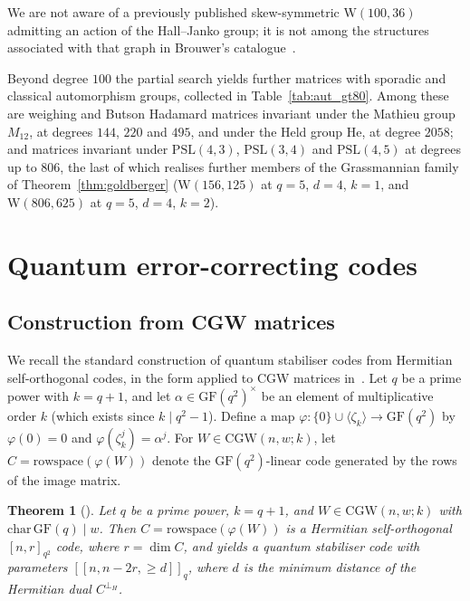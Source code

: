 \documentclass{article}
\newtheorem{theorem}{Theorem}[section]
\theoremstyle{definition}
\theoremstyle{remark}
\newcommand{\CGW}{\mathrm{CGW}}
\newcommand{\We}{\mathrm{W}}
\newcommand{\GF}{\mathrm{GF}}
\begin{document}
We are not aware of a previously published
skew-symmetric $\We(100, 36)$ admitting an action of the Hall--Janko group; 
it is not among the structures associated with that graph in Brouwer's
catalogue~\cite{BrouwerHJ}.

Beyond degree $100$ the partial search yields further matrices with
sporadic and classical automorphism groups, collected in
Table~\ref{tab:aut_gt80}.  Among these are weighing and Butson Hadamard
matrices invariant under the Mathieu group $M_{12}$, at degrees $144$,
$220$ and $495$, and under the Held group $\mathrm{He}$, at degree
$2058$; and matrices invariant under $\mathrm{PSL}(4,3)$,
$\mathrm{PSL}(3,4)$ and $\mathrm{PSL}(4,5)$ at degrees up to $806$, the
last of which realises further members of the Grassmannian family of
Theorem~\ref{thm:goldberger} ($\We(156,125)$ at $q=5$, $d=4$, $k=1$, and
$\We(806,625)$ at $q=5$, $d=4$, $k=2$).


\section{Quantum error-correcting codes}\label{sec:quantum}

\subsection{Construction from CGW matrices}

We recall the standard construction of quantum stabiliser codes from Hermitian self-orthogonal codes, in the form applied to CGW matrices in~\cite{CGW-Survey}.
Let $q$ be a prime power with $k = q+1$, and let $\alpha \in \GF(q^2)^{\times}$ be an element
of multiplicative order $k$ (which exists since $k \mid q^2-1$). Define a map
$\varphi \colon \{0\} \cup \langle \zeta_k \rangle \to \GF(q^2)$ by $\varphi(0) = 0$ and
$\varphi(\zeta_k^j) = \alpha^j$. For $W \in \CGW(n,w;k)$, let
$C = \mathrm{rowspace}(\varphi(W))$ denote the $\GF(q^2)$-linear code generated by the rows of
the image matrix.

\begin{theorem}[{\cite[Section~4]{CGW-Survey}}]\label{thm:egan-qecc}
Let $q$ be a prime power, $k = q+1$, and $W \in \CGW(n,w;k)$ with
$\mathrm{char}\,\GF(q) \mid w$. Then $C = \mathrm{rowspace}(\varphi(W))$ is a Hermitian
self-orthogonal $[n,r]_{q^2}$ code, where $r = \dim C$, and yields a quantum stabiliser code
with parameters $[[n, n-2r, \geq d]]_q$, where $d$ is the minimum distance of the Hermitian dual
$C^{\perp_H}$. 
\end{theorem}
\end{document}
